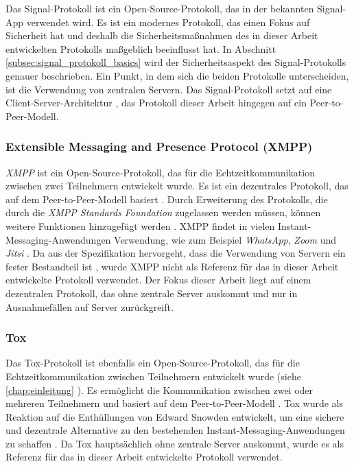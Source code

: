Das Signal-Protokoll ist ein Open-Source-Protokoll, das in der bekannten Signal-App verwendet wird. Es ist ein modernes Protokoll, das einen Fokus auf Sicherheit hat \parencite{Signal_website} und deshalb die Sicherheitsmaßnahmen des in dieser Arbeit entwickelten Protokolls maßgeblich beeinflusst hat. In Abschnitt \ref{subsec:signal_protokoll_basics} \textit{} wird der Sicherheitsaspekt des Signal-Protokolls genauer beschrieben. Ein Punkt, in dem sich die beiden Protokolle unterscheiden, ist die Verwendung von zentralen Servern. Das Signal-Protokoll setzt auf eine Client-Server-Architektur \parencite{Github_libsignal}, das Protokoll dieser Arbeit hingegen auf ein Peer-to-Peer-Modell.


\subsubsection{Extensible Messaging and Presence Protocol (XMPP)}
\label{subsubsection:xmpp}

\textit{XMPP} ist ein Open-Source-Protokoll, das für die Echtzeitkommunikation zwischen zwei Teilnehmern entwickelt wurde. Es ist ein dezentrales Protokoll, das auf dem Peer-to-Peer-Modell basiert \parencite{rfc6120_XMPP}. Durch Erweiterung des Protokolls, die durch die \textit{XMPP Standards Foundation} zugelassen werden müssen, können weitere Funktionen hinzugefügt werden \parencite{xmpp_extensions}. XMPP findet in vielen Instant-Messaging-Anwendungen Verwendung, wie zum Beispiel \textit{WhatsApp}, \textit{Zoom} und \textit{Jitsi} \parencite{xmpp_im}. Da aus der Spezifikation hervorgeht, dass die Verwendung von Servern ein fester Bestandteil ist \parencite{rfc6120_XMPP}, wurde XMPP nicht als Referenz für das in dieser Arbeit entwickelte Protokoll verwendet. Der Fokus dieser Arbeit liegt auf einem dezentralen Protokoll, das ohne zentrale Server auskommt und nur in Ausnahmefällen auf Server zurückgreift.


\subsubsection{Tox}
\label{subsubsection:tox}

Das Tox-Protokoll ist ebenfalls ein Open-Source-Protokoll, das für die Echtzeitkommunikation zwischen Teilnehmern entwickelt wurde (siehe \ref{chap:einleitung} \textit{}). Es ermöglicht die Kommunikation zwischen zwei oder mehreren Teilnehmern und basiert auf dem Peer-to-Peer-Modell \parencite{Tox_FAQ}. Tox wurde als Reaktion auf die Enthüllungen von Edward Snowden entwickelt, um eine sichere und dezentrale Alternative zu den bestehenden Instant-Messaging-Anwendungen zu schaffen \parencite{tox_about}. Da Tox hauptsächlich ohne zentrale Server auskommt, wurde es als Referenz für das in dieser Arbeit entwickelte Protokoll verwendet.




